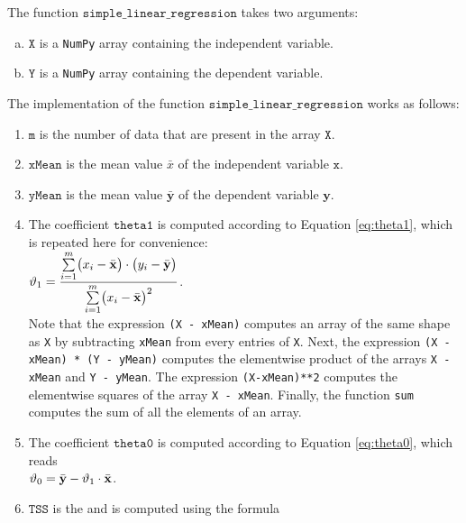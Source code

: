 \noindent
The function $\mathtt{simple\_linear\_regression}$ takes two arguments:
\begin{enumerate}[(a)]
\item $\mathtt{X}$ is a \texttt{NumPy} array containing the independent variable.
\item $\mathtt{Y}$ is a \texttt{NumPy} array containing the dependent variable.
\end{enumerate}
The implementation of the function $\mathtt{simple\_linear\_regression}$ works as follows:
\begin{enumerate}
\item $\mathtt{m}$ is the number of data that are present in the array $\texttt{X}.$
\item $\mathtt{xMean}$ is the mean value $\bar{x}$ of the independent variable $\mathtt{x}$.
\item $\mathtt{yMean}$ is the mean value $\bar{\mathbf{y}}$ of the dependent variable $\mathbf{y}$. 
\item The coefficient $\mathtt{theta1}$ is computed according to Equation \ref{eq:theta1}, which is repeated
      here for convenience:
      \\[0.2cm]
      \hspace*{1.3cm}
      $\displaystyle\vartheta_1 = \frac{\sum\limits_{i=1}^m \bigl(x_i - \bar{\mathbf{x}}\bigr) \cdot \bigl(y_i - \bar{\mathbf{y}}\bigr)}{
                        \sum\limits_{i=1}^m \bigl(x_i - \bar{\mathbf{x}}\bigr)^2}  
      $.
      \\[0.2cm]
      Note that the expression \texttt{(X - xMean)} computes an array of the same shape as \texttt{X}
      by subtracting \texttt{xMean} from every entries of \texttt{X}.
      Next, the expression \texttt{(X - xMean) * (Y - yMean)} computes the elementwise product
      of the arrays \texttt{X - xMean} and \texttt{Y - yMean}.
      The expression \texttt{(X-xMean)**2} computes the elementwise squares of the array \texttt{X - xMean}.
      Finally, the function \texttt{sum} computes the sum of all the elements of an array.
\item The coefficient $\mathtt{theta0}$ is computed according to Equation \ref{eq:theta0}, which reads
      \\[0.2cm]
      \hspace*{1.3cm}
      $\displaystyle\vartheta_0 = \bar{\mathbf{y}} - \vartheta_1 \cdot \bar{\mathbf{x}}$.
\item $\mathtt{TSS}$ is the  and is computed using the formula
      \\[0.2cm]

\end{enumerate}
